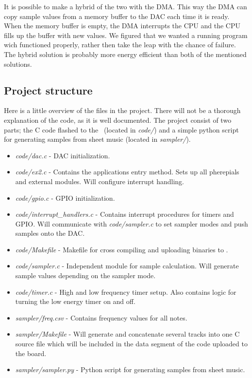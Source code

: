 It is possible to make a hybrid of the two with the DMA. This way the DMA can copy sample values from a memory buffer to the DAC each time it is ready. When the memory buffer is empty, the DMA interrupts the CPU and the CPU fills up the buffer with new values. We figured that we wanted a running program wich functioned properly, rather then take the leap with the chance of failure. The hybrid solution is probably more energy efficient than both of the mentioned solutions.  


\subsection{Project structure}
Here is a little overview of the files in the project. There will not be a thorough explanation of the code, as it is well documented. The project consist of two parts; the C code flashed to the \boardName\ (located in \emph{code/}) and a simple python script for generating samples from sheet music (located in \emph{sampler/}).

\begin{itemize}
	\item \emph{code/dac.c} - DAC initialization.
	\item \emph{code/ex2.c} - Contains the applications entry method. Sets up all pherepials and external modules. Will configure interrupt handling.
	\item \emph{code/gpio.c} - GPIO initialization.
	\item \emph{code/interrupt\_handlers.c} - Contains interrupt procedures for timers and GPIO. Will communicate with \emph{code/sampler.c} to set sampler modes and push samples onto the DAC.
	\item \emph{code/Makefile} - Makefile for cross compiling and uploading binaries to \boardName .
	\item \emph{code/sampler.c} - Independent module for sample calculation. Will generate sample values depending on the sampler mode.
	\item \emph{code/timer.c} - High and low frequency timer setup. Also contains logic for turning the low energy timer on and off.
	\item \emph{sampler/freq.csv} - Contains frequency values for all notes.
	\item \emph{sampler/Makefile} - Will generate and concatenate several tracks into one C source file which will be included in the data segment of the code uploaded to the board.
	\item \emph{sampler/sampler.py} - Python script for generating samples from sheet music.
\end{itemize}

